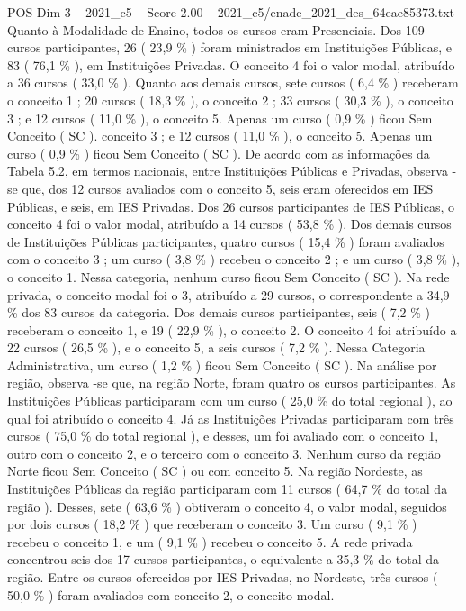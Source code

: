 \begin{textsample}{POS Dim 3 – 2021\_c5 – Score 2.00 – 2021\_c5/enade\_2021\_des\_64eae85373.txt}
Quanto à Modalidade de Ensino, todos os cursos eram Presenciais.
Dos 109 cursos participantes, 26 ( 23,9 \% ) foram ministrados em Instituições Públicas, e 83 ( 76,1 \% ), em Instituições Privadas.
O conceito 4 foi o valor modal, atribuído a 36 cursos ( 33,0 \% ).
Quanto aos demais cursos, sete cursos ( 6,4 \% ) receberam o conceito 1 ; 20 cursos ( 18,3 \% ), o conceito 2 ; 33 cursos ( 30,3 \% ), o conceito 3 ; e 12 cursos ( 11,0 \% ), o conceito 5.
Apenas um curso ( 0,9 \% ) ficou Sem Conceito ( SC ). conceito 3 ; e 12 cursos ( 11,0 \% ), o conceito 5.
Apenas um curso ( 0,9 \% ) ficou Sem Conceito ( SC ).
De acordo com as informações da Tabela 5.2, em termos nacionais, entre Instituições Públicas e Privadas, observa -se que, dos 12 cursos avaliados com o conceito 5, seis eram oferecidos em IES Públicas, e seis, em IES Privadas.
Dos 26 cursos participantes de IES Públicas, o conceito 4 foi o valor modal, atribuído a 14 cursos ( 53,8 \% ).
Dos demais cursos de Instituições Públicas participantes, quatro cursos ( 15,4 \% ) foram avaliados com o conceito 3 ; um curso ( 3,8 \% ) recebeu o conceito 2 ; e um curso ( 3,8 \% ), o conceito 1.
Nessa categoria, nenhum curso ficou Sem Conceito ( SC ).
Na rede privada, o conceito modal foi o 3, atribuído a 29 cursos, o correspondente a 34,9 \% dos 83 cursos da categoria.
Dos demais cursos participantes, seis ( 7,2 \% ) receberam o conceito 1, e 19 ( 22,9 \% ), o conceito 2.
O conceito 4 foi atribuído a 22 cursos ( 26,5 \% ), e o conceito 5, a seis cursos ( 7,2 \% ).
Nessa Categoria Administrativa, um curso ( 1,2 \% ) ficou Sem Conceito ( SC ).
Na análise por região, observa -se que, na região Norte, foram quatro os cursos participantes.
As Instituições Públicas participaram com um curso ( 25,0 \% do total regional ), ao qual foi atribuído o conceito 4.
Já as Instituições Privadas participaram com três cursos ( 75,0 \% do total regional ), e desses, um foi avaliado com o conceito 1, outro com o conceito 2, e o terceiro com o conceito 3.
Nenhum curso da região Norte ficou Sem Conceito ( SC ) ou com conceito 5.
Na região Nordeste, as Instituições Públicas da região participaram com 11 cursos ( 64,7 \% do total da região ).
Desses, sete ( 63,6 \% ) obtiveram o conceito 4, o valor modal, seguidos por dois cursos ( 18,2 \% ) que receberam o conceito 3.
Um curso ( 9,1 \% ) recebeu o conceito 1, e um ( 9,1 \% ) recebeu o conceito 5.
A rede privada concentrou seis dos 17 cursos participantes, o equivalente a 35,3 \% do total da região.
Entre os cursos oferecidos por IES Privadas, no Nordeste, três cursos ( 50,0 \% ) foram avaliados com conceito 2, o conceito modal.

\end{textsample}
